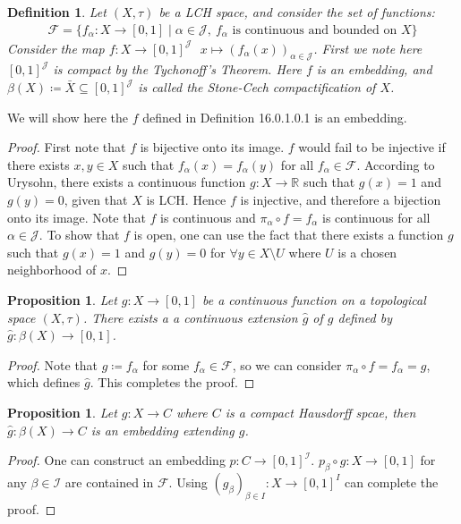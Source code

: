 \documentclass[11pt]{book}
\theoremstyle{break}
\theoremstyle{break}
\newtheorem{prop}[lem]{Proposition}
\newtheorem{defn}{Definition}[corL]
\newcommand{\R}{\mathbb{R}}
\begin{document}
\begin{defn}
Let $(X,\tau)$ be a LCH space, and consider the set of functions:
\begin{align*}
\mathcal{F} = \{f_\alpha : X \to [0,1] \mid \alpha \in \mathcal{J}, \ f_\alpha\text{ is continuous and bounded on }X\}
\end{align*}
Consider the map $f:X \to [0,1]^\mathcal{J} \ \ \ x\mapsto (f_\alpha(x))_{\alpha \in \mathcal{J}}$. First we note here $[0,1]^\mathcal{J}$ is compact by the Tychonoff's Theorem. Here $f$ is an embedding, and $\beta(X) \coloneqq \bar{X} \subseteq [0,1]^\mathcal{J}$ is called the Stone-Cech compactification of $X$. 
\end{defn}
We will show here the $f$ defined in Definition 16.0.1.0.1 is an embedding.
\begin{proof}
First note that $f$ is bijective onto its image. $f$ would fail to be injective if there exists $x ,y\in X$ such that $f_\alpha(x) = f_\alpha	 (y)$ for all $f_\alpha \in \mathcal{F}$. According to Urysohn, there exists a continuous function $g:X \to \R$ such that $g(x) = 1$ and $g(y) = 0$, given that $X$ is LCH. Hence $f$ is injective, and therefore a bijection onto its image. Note that $f$ is continuous and $\pi_\alpha \circ f = f_\alpha$ is continuous for all $\alpha \in \mathcal{J}$. To show that $f$ is open, one can use the fact that there exists a function $g$ such that $g(x) = 1$ and $g(y)= 0$ for $\forall y \in X\setminus U$ where $U$ is a chosen neighborhood of $x$. 
\end{proof}

\begin{prop}
Let $g:X \to [0,1]$ be a continuous function on a topological space $(X,\tau)$. There exists a a continuous extension $\hat{g}$ of $g$ defined by $\hat{g}:\beta(X) \to [0,1]$. 
\end{prop}
\begin{proof}
Note that $g\coloneqq f_\alpha$ for some $f_\alpha \in \mathcal{F}$, so we can consider $\pi_\alpha \circ f = f_\alpha = g$, which defines $\hat{g}$. This completes the proof. 
\end{proof}

\begin{prop}
Let $g:X \to C$ where $C$ is a compact Hausdorff spcae, then $\hat{g}:\beta(X) \to C$ is an embedding extending $g$. 
\end{prop}
\begin{proof}
One can construct an embedding $p:C \to [0,1]^\mathcal{I}$. $p_\beta \circ g : X \to [0,1]$ for any $\beta \in \mathcal{I}$ are contained in $\mathcal{F}$. Using $(g_\beta)_{\beta \in I}:X \to [0,1]^I$ can complete the proof. 
\end{proof}
\end{document}
